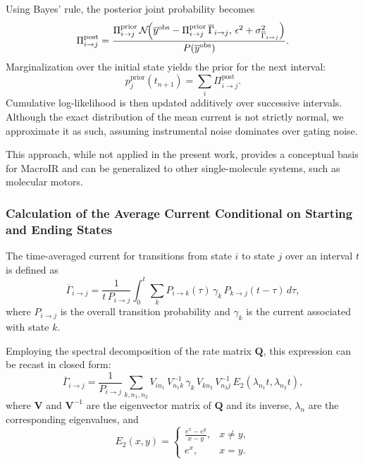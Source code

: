 \documentclass[pdflatex,sn-mathphys-num]{sn-jnl}%
\theoremstyle{thmstyleone}%
\theoremstyle{thmstyletwo}%
\theoremstyle{thmstylethree}%
\begin{document}
Using Bayes' rule, the posterior joint probability becomes
\begin{equation}
	\Pi_{i\rightarrow j}^{\text{post}} = \frac{\Pi_{i\rightarrow j}^{\text{prior}}\,\mathcal{N}\!\Bigl(\overline{y}^{\text{obs}} - \Pi_{i\rightarrow j}^{\text{prior}}\,\overline{\Gamma}_{i\rightarrow j},\, \epsilon^2 + \sigma^2_{\overline{\Gamma}_{i\rightarrow j}}\Bigr)}{P(\overline{y}^{\text{obs}})}.
	\label{eq:integrated_posterior_short}
\end{equation}
Marginalization over the initial state yields the prior for the next interval:
\begin{equation}
	p_j^{\text{prior}}(t_{n+1}) = \sum_i \Pi_{i\rightarrow j}^{\text{post}}.
	\label{eq:next_prior_short}
\end{equation}
Cumulative log-likelihood is then updated additively over successive intervals. Although the exact distribution of the mean current is not strictly normal, we approximate it as such, assuming instrumental noise dominates over gating noise.

This approach, while not applied in the present work, provides a conceptual basis for MacroIR and can be generalized to other single-molecule systems, such as molecular motors.


\subsubsection{Calculation of the Average Current Conditional on Starting and Ending States}

The time-averaged current for transitions from state \(i\) to state \(j\) over an interval \(t\) is defined as
\begin{equation}
	\overline{\Gamma}_{i \rightarrow j} = \frac{1}{t\,P_{i\rightarrow j}} \int_0^t \sum_k P_{i\rightarrow k}(\tau)\,\gamma_k\,P_{k\rightarrow j}(t-\tau)\,d\tau,
	\label{eq:gamma_ij_integral_short}
\end{equation}
where \(P_{i\rightarrow j}\) is the overall transition probability and \(\gamma_k\) is the current associated with state \(k\).

Employing the spectral decomposition of the rate matrix \(\mathbf{Q}\), this expression can be recast in closed form:
\begin{equation}
	\overline{\Gamma}_{i \rightarrow j} = \frac{1}{P_{i\rightarrow j}} \sum_{k, n_1, n_2} V_{i n_1}\,V^{-1}_{n_1 k}\,\gamma_k\,V_{k n_2}\,V^{-1}_{n_2 j}\,E_2(\lambda_{n_1}t,\lambda_{n_2}t),
	\label{eq:gamma_ij_formula_short}
\end{equation}
where \(\mathbf{V}\) and \(\mathbf{V}^{-1}\) are the eigenvector matrix of \(\mathbf{Q}\) and its inverse, \(\lambda_{n}\) are the corresponding eigenvalues, and
\begin{equation}
	E_2(x,y)=
	\begin{cases}
		\frac{e^x-e^y}{x-y}, & x\neq y, \\
		e^x, & x=y.
	\end{cases}
	\label{eq:E2_short}
\end{equation}
\end{document}

